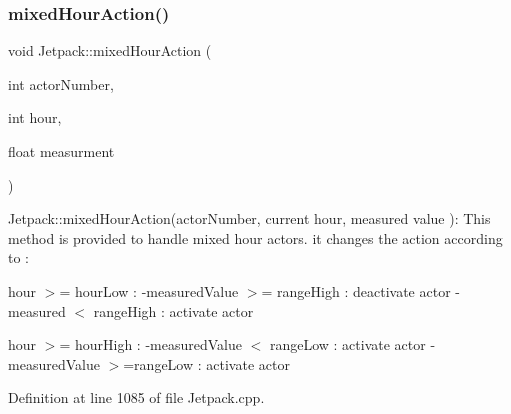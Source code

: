 \subsubsection{\texorpdfstring{mixed\+Hour\+Action()}{mixedHourAction()}}
{\footnotesize\ttfamily void Jetpack\+::mixed\+Hour\+Action (\begin{DoxyParamCaption}\item[{int}]{actor\+Number,  }\item[{int}]{hour,  }\item[{float}]{measurment }\end{DoxyParamCaption})}

Jetpack\+::mixed\+Hour\+Action(actor\+Number, current hour, measured value )\+: This method is provided to handle mixed hour actors. it changes the action according to \+:

hour $>$= hour\+Low \+: -\/measured\+Value $>$= range\+High \+: deactivate actor -\/measured $<$ range\+High \+: activate actor

hour $>$= hour\+High \+: -\/measured\+Value $<$ range\+Low \+: activate actor -\/measured\+Value $>$=range\+Low \+: activate actor 

Definition at line 1085 of file Jetpack.\+cpp.


